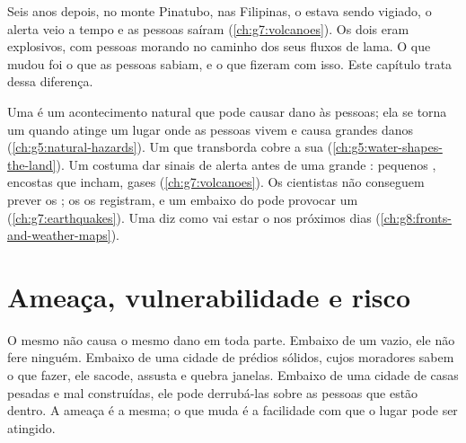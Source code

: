 Seis anos depois, no monte Pinatubo, nas Filipinas, o  estava sendo
vigiado, o alerta veio a tempo e as pessoas saíram
(\cref{ch:g7:volcanoes}). Os dois eram  explosivos, com pessoas
morando no caminho dos seus fluxos de lama. O que mudou foi o que as
pessoas sabiam, e o que fizeram com isso. Este capítulo
trata dessa diferença.

\begin{recall}
Uma \emph{} é um acontecimento natural que pode causar dano
às pessoas; ela se torna um \emph{} quando atinge um lugar
onde as pessoas vivem e causa grandes danos
(\cref{ch:g5:natural-hazards}). Um  que transborda cobre a sua
 (\cref{ch:g5:water-shapes-the-land}). Um 
costuma dar sinais de alerta antes de uma grande : pequenos
, encostas que incham, gases (\cref{ch:g7:volcanoes}). Os
cientistas não conseguem prever os ; os  os
registram, e um  embaixo do  pode provocar um 
(\cref{ch:g7:earthquakes}). Uma  diz como vai estar o
 nos próximos dias (\cref{ch:g8:fronts-and-weather-maps}).
\end{recall}

\section{Ameaça, vulnerabilidade e risco}

O mesmo  não causa o mesmo dano em toda parte. Embaixo de um
 vazio, ele não fere ninguém. Embaixo de uma cidade de prédios
sólidos, cujos moradores sabem o que fazer, ele sacode, assusta e quebra
janelas. Embaixo de uma cidade de casas pesadas e mal construídas, ele
pode derrubá-las sobre as pessoas que estão dentro. A ameaça é a mesma; o
que muda é a facilidade com que o lugar pode ser atingido.

